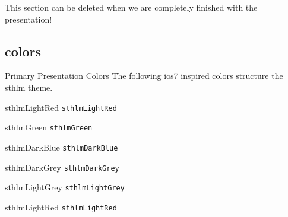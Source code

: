 \documentclass[compress]{beamer}
\begin{document}
This section can be deleted when we are completely finished with the presentation!

\subsection{colors}


\begin{frame}{Primary Presentation Colors}
	The following ios7 inspired colors structure the sthlm theme.
	
	\begin{multicols}{2}
		
		\begin{beamercolorbox}[wd=\linewidth,ht=2ex,dp=0.7ex]{sthlmLightRed}
			\texttt{sthlmLightRed}
		\end{beamercolorbox}
		
		\begin{beamercolorbox}[wd=\linewidth,ht=2ex,dp=0.7ex]{sthlmGreen}
			\texttt{sthlmGreen}
		\end{beamercolorbox}
		
		\begin{beamercolorbox}[wd=\linewidth,ht=2ex,dp=0.7ex]{sthlmDarkBlue}
			\texttt{sthlmDarkBlue}
		\end{beamercolorbox}
		
		\begin{beamercolorbox}[wd=\linewidth,ht=2ex,dp=0.7ex]{sthlmDarkGrey}
			\texttt{sthlmDarkGrey}
		\end{beamercolorbox}
		
		\begin{beamercolorbox}[wd=\linewidth,ht=2ex,dp=0.7ex]{sthlmLightGrey}
			\texttt{sthlmLightGrey}
		\end{beamercolorbox}
		
		
		\begin{beamercolorbox}[wd=\linewidth,ht=2ex,dp=0.7ex]{sthlmLightRed}
			\texttt{sthlmLightRed}
		\end{beamercolorbox}
		

\end{multicols}
\end{frame}
\end{document}
